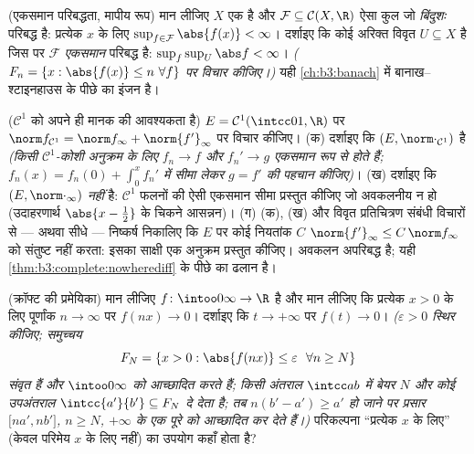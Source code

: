 \begin{exercise}[$\star\star\star$]\label{exo:b3:complete:10}
(एकसमान परिबद्धता, मापीय रूप) मान लीजिए $X$ एक  है और $\mathcal F \subseteq \mathcal C(X, \R)$ ऐसा कुल जो \emph{बिंदुशः} परिबद्ध है: प्रत्येक
$x$ के लिए $\sup_{f \in \mathcal
F}\abs{f(x)} < \infty$। दर्शाइए कि कोई अरिक्त विवृत $U \subseteq X$ है जिस पर
$\mathcal F$ \emph{एकसमान} परिबद्ध है: $\sup_{f}\sup_U \abs f < \infty$। \emph{($F_n = \{x : \abs{f(x)} \leq n\ \forall f\}$ पर विचार
कीजिए।)} यही \cref{ch:b3:banach} में बानाख--श्टाइनहाउस के पीछे का इंजन है।
\end{exercise}

\begin{exercise}[$\star\star$]\label{exo:b3:complete:11}
($\mathcal C^1$ को अपने ही मानक की आवश्यकता है) $E = \mathcal
C^1(\intcc01, \R)$ पर $\norm f_{\mathcal C^1} = \norm
f_\infty + \norm{f'}_\infty$ पर विचार
कीजिए।
(क) दर्शाइए कि $(E, \norm\cdot_{\mathcal C^1})$  है \emph{(किसी $\mathcal C^1$-कोशी अनुक्रम के
लिए $f_n \to f$ और $f_n' \to g$ एकसमान रूप से होते हैं; $f_n(x) = f_n(0) + \int_0^xf_n'$ में सीमा लेकर
$g = f'$ की पहचान कीजिए)}।
(ख) दर्शाइए कि $(E, \norm\cdot_\infty)$  \emph{नहीं} है: $\mathcal C^1$ फलनों की ऐसी
एकसमान सीमा प्रस्तुत कीजिए जो अवकलनीय न हो (उदाहरणार्थ $\abs{x - \tfrac12}$ के
चिकने आसन्नन)।
(ग) (क), (ख) और विवृत प्रतिचित्रण संबंधी विचारों से --- अथवा
सीधे --- निष्कर्ष निकालिए कि $E$ पर कोई नियतांक $C$ $\norm{f'}_\infty \leq C\,\norm f_\infty$ को
संतुष्ट नहीं करता: इसका साक्षी एक अनुक्रम प्रस्तुत कीजिए। अवकलन
अपरिबद्ध है; यही \cref{thm:b3:complete:nowherediff} के पीछे का ढलान है।
\end{exercise}

\begin{exercise}[$\star\star\star$]\label{exo:b3:complete:12}
(क्रॉफ्ट की प्रमेयिका) मान लीजिए $f\colon\intoo0\infty\to\R$  है और मान लीजिए कि
प्रत्येक $x > 0$ के लिए पूर्णांक $n \to \infty$ पर $f(nx) \to 0$। दर्शाइए कि $t \to
+\infty$
पर $f(t) \to 0$। \emph{($\varepsilon > 0$ स्थिर कीजिए; समुच्चय
\[
F_N = \{x > 0 : \abs{f(nx)} \leq \varepsilon\ \ \forall n
\geq N\}
\]
संवृत हैं और $\intoo0\infty$ को आच्छादित करते हैं; किसी अंतराल $\intcc ab$ में
बेयर $N$ और कोई उपअंतराल $\intcc{a'}{b'}
\subseteq F_N$ दे देता है; तब $n(b' - a') \geq a'$ हो जाने पर
प्रसार $\bigl[na', nb'\bigr]$, $n
\geq N$, $+\infty$ के एक पूरे  को आच्छादित कर
देते हैं।)} परिकल्पना ``प्रत्येक $x$ के लिए'' (केवल परिमेय
$x$ के लिए नहीं) का उपयोग कहाँ होता है?
\end{exercise}

